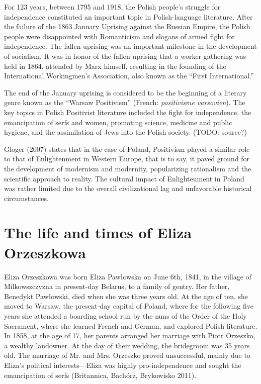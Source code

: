 For 123 years, between 1795 and 1918, the Polish people's struggle for independence constituted an important topic in Polish-language literature.
After the failure of the 1863 January Uprising against the Russian Empire, the Polish people were disappointed with Romanticism and slogans of armed fight for independence.
The fallen uprising was an important milestone in the development of socialism.
It was in honor of the fallen uprising that a worker gathering was held in 1864, attended by Marx himself, resulting in the founding of the International Workingmen's Association, also known as the ``First International.''

The end of the January uprising is considered to be the beginning of a literary genre known as the ``Warsaw Positivism'' (French: \textit{positivisme varsovien}).
The key topics in Polish Positivist literature included the fight for independence, the emancipation of serfs and women, promoting science, medicine and public hygiene, and the assimilation of Jews into the Polish society.
(TODO: source?)

Gloger (2007) states that in the case of Poland, Positivism played a similar role to that of Enlightenment in Western Europe, that is to say, it paved ground for the development of modernism and modernity, popularizing rationalism and the scientific approach to reality. The cultural impact of Enlightenment in Poland was rather limited due to the overall civilizational lag and unfavorable historical circumstances.

\section{The life and times of Eliza Orzeszkowa}

Eliza Orzeszkowa was born Eliza Pawłowska on June 6th, 1841, in the village of Milkowszczyzna in present-day Belarus, to a family of gentry. Her father, Benedykt Pawłowski, died when she was three years old. 
At the age of ten, she moved to Warsaw, the present-day capital of Poland, where for the following five years she attended a boarding school run by the nuns of the Order of the Holy Sacrament, where she learned French and German, and explored Polish literature.
In 1858, at the age of 17, her parents arranged her marriage with Piotr Orzeszko, a wealthy landowner.
At the day of their wedding, the bridegroom was 35 years old.
The marriage of Mr. and Mrs. Orzeszko proved unsuccessful, mainly due to Eliza's political interests---Eliza was highly pro-independence and sought the emancipation of serfs (Britannica, Bachórz, Brykowisko 2011).

